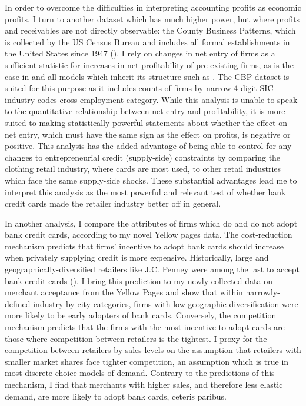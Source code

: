 \documentclass[12pt,english]{article}
\begin{document}
In order to overcome the difficulties in interpreting accounting profits as economic profits, I turn to another dataset which has much higher power, but where profits and receivables are not directly observable: the County Business Patterns, which is collected by the US Census Bureau and includes all formal establishments in the United States since 1947 (\cite{eckert_early_2022}). I rely on changes in net entry of firms as a sufficient statistic for increases in net profitability of pre-existing firms, as is the case in \cite{hopenhayn_entry_1992} and all models which inherit its structure such as \cite{melitz_impact_2003}. The CBP dataset is suited for this purpose as it includes counts of firms by narrow 4-digit SIC industry codes-cross-employment category. While this analysis is unable to speak to the quantitative relationship between net entry and profitability, it is more suited to making statistically powerful statements about whether the effect on net entry, which must have the same sign as the effect on profits, is negative or positive. This analysis has the added advantage of being able to control for any changes to entrepreneurial credit (supply-side) constraints by comparing the clothing retail industry, where cards are most used, to other retail industries which face the same supply-side shocks. These substantial advantages lead me to interpret this analysis as the most powerful and relevant test of whether bank credit cards made the retailer industry better off in general. 

In another analysis, I compare the attributes of firms which do and do not adopt bank credit cards, according to my novel Yellow pages data. The cost-reduction mechanism predicts that firms' incentive to adopt bank cards should increase when privately supplying credit is more expensive. Historically, large and geographically-diversified retailers like J.C. Penney were among the last to accept bank credit cards (\cite{hyman_borrow_2012}). I bring this prediction to my newly-collected data on merchant acceptance from the Yellow Pages and show that within narrowly-defined industry-by-city categories, firms with low geographic diversification were more likely to be early adopters of bank cards. Conversely, the competition mechanism predicts that the firms with the most incentive to adopt cards are those where competition between retailers is the tightest. I proxy for the competition between retailers by sales levels on the assumption that retailers with smaller market shares face tighter competition, an assumption which is true in most discrete-choice models of demand. Contrary to the predictions of this mechanism, I find that merchants with higher sales, and therefore less elastic demand, are more likely to adopt bank cards, ceteris paribus. 
\end{document}
